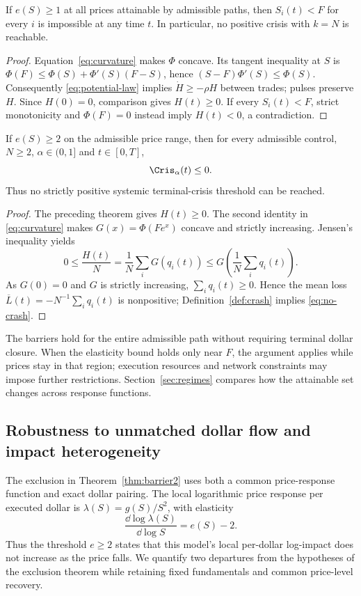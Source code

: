 \documentclass[review,hidelinks,onefignum,onetabnum]{siamonline250211}
\begin{document}
\begin{theorem}\label{thm:barrier1}
If $e(S)\ge1$ at all prices attainable by admissible paths, then $S_i(t)<F$ for every $i$ is impossible at any time $t$. In particular, no positive crisis with $k=N$ is reachable.
\end{theorem}
\begin{proof}
Equation~\eqref{eq:curvature} makes $\Phi$ concave. Its tangent inequality at $S$ is $\Phi(F)\le\Phi(S)+\Phi'(S)(F-S)$, hence $(S-F)\Phi'(S)\le\Phi(S)$. Consequently \eqref{eq:potential-law} implies $\dot H\ge-\rho H$ between trades; pulses preserve $H$. Since $H(0)=0$, comparison gives $H(t)\ge0$. If every $S_i(t)<F$, strict monotonicity and $\Phi(F)=0$ instead imply $H(t)<0$, a contradiction.
\end{proof}

\begin{theorem}\label{thm:barrier2}
If $e(S)\ge2$ on the admissible price range, then for every admissible control, $N\ge2$, $\alpha\in(0,1]$ and $t\in[0,T]$,
\begin{equation}\label{eq:no-crash}
\Cris_\alpha(t)\le0.
\end{equation}
Thus no strictly positive systemic terminal-crisis threshold can be reached.
\end{theorem}
\begin{proof}
The preceding theorem gives $H(t)\ge0$. The second identity in \eqref{eq:curvature} makes $G(x)=\Phi(Fe^x)$ concave and strictly increasing. Jensen's inequality yields
\[
0\le\frac{H(t)}N=\frac1N\sum_iG(q_i(t))
\le G\!\left(\frac1N\sum_iq_i(t)\right).
\]
As $G(0)=0$ and $G$ is strictly increasing, $\sum_iq_i(t)\ge0$. Hence the mean loss $\overline L(t)=-N^{-1}\sum_iq_i(t)$ is nonpositive; Definition~\ref{def:crash} implies \eqref{eq:no-crash}.
\end{proof}

The barriers hold for the entire admissible path without requiring terminal dollar closure. When the elasticity bound holds only near $F$, the argument applies while prices stay in that region; execution resources and network constraints may impose further restrictions. Section~\ref{sec:regimes} compares how the attainable set changes across response functions.

\subsection{Robustness to unmatched dollar flow and impact heterogeneity}
\label{subsec:barrier-robustness}
The exclusion in Theorem~\ref{thm:barrier2} uses both a common
price-response function and exact dollar pairing. The local logarithmic
price response per executed dollar is
$\lambda(S)=g(S)/S^2$, with elasticity
\[
\frac{\dd\log\lambda(S)}{\dd\log S}=e(S)-2.
\]
Thus the threshold $e\ge2$ states that this model's local
per-dollar log-impact does not increase as the price falls.
We quantify two departures from the hypotheses of the exclusion theorem
while retaining fixed fundamentals and common price-level recovery.
\end{document}
